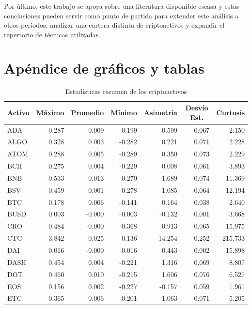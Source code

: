 \documentclass[runningheads,legalpaper,10pt]{etc/llncs}
\let\stdsection\section
\renewcommand\section{\newpage\stdsection}
\begin{document}
Por último, este trabajo se apoya sobre una literatura disponible escasa y estas conclusiones pueden servir como punto de partida para extender este análisis a otros periodos, analizar una cartera distinta de criptoactivos y expandir el repertorio de técnicas utilizadas. 

\printbibliography %

\section{Apéndice de gráficos y tablas}
\begin{table}[htbp]
  \centering
  \caption{Estadísticas resumen de los criptoactivos}
  \begin{tabular}{lrrrrrr}
    \toprule
    \multicolumn{1}{c}{\textbf{Activo}} & \multicolumn{1}{c}{\textbf{Máximo}} & \multicolumn{1}{c}{\textbf{Promedio}} & \multicolumn{1}{c}{\textbf{Mínimo}} & \multicolumn{1}{c}{\textbf{Asimetría}} & \multicolumn{1}{c}{\textbf{Desvío Est.}} & \multicolumn{1}{c}{\textbf{Curtosis}} \\
    \midrule
    ADA   & 0.287 & 0.009 & -0.199 & 0.599 & 0.067 & 2.150 \\
    ALGO  & 0.328 & 0.003 & -0.282 & 0.221 & 0.071 & 2.228 \\
    ATOM  & 0.288 & 0.005 & -0.289 & 0.350 & 0.073 & 2.229 \\
    BCH   & 0.275 & 0.004 & -0.229 & 0.008 & 0.061 & 3.893 \\
    BNB   & 0.533 & 0.013 & -0.270 & 1.689 & 0.074 & 11.369 \\
    BSV   & 0.459 & 0.001 & -0.278 & 1.085 & 0.064 & 12.194 \\
    BTC   & 0.178 & 0.006 & -0.141 & 0.164 & 0.038 & 2.640 \\
    BUSD  & 0.003 & -0.000 & -0.003 & -0.132 & 0.001 & 3.668 \\
    CRO   & 0.484 & -0.000 & -0.368 & 0.913 & 0.065 & 15.975 \\
    CTC   & 3.842 & 0.025 & -0.136 & 14.254 & 0.252 & 215.733 \\
    DAI   & 0.016 & -0.000 & -0.016 & 0.443 & 0.002 & 15.898 \\
    DASH  & 0.454 & 0.004 & -0.221 & 1.316 & 0.069 & 8.807 \\
    DOT   & 0.460 & 0.010 & -0.215 & 1.606 & 0.076 & 6.527 \\
    EOS   & 0.156 & 0.002 & -0.227 & -0.157 & 0.059 & 1.961 \\
    ETC   & 0.365 & 0.006 & -0.201 & 1.063 & 0.071 & 5.205 \\

\end{tabular}
\end{table}
\end{document}
